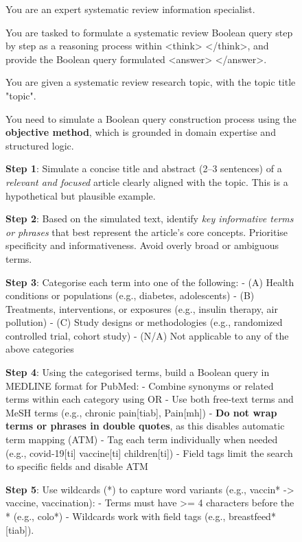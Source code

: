 \begin{figure}[ht!]
	\centering
		\small
	\begin{PromptBox}
		You are an expert systematic review information specialist.
		
		You are tasked to formulate a systematic review Boolean query step by step as a reasoning process within <think> </think>, and provide the Boolean query formulated <answer> </answer>.
	\end{PromptBox}
	
	\vspace{1em}
	
	\begin{PromptBox}
		You are given a systematic review research topic, with the topic title "{topic}".
		
		You need to simulate a Boolean query construction process using the \textbf{objective method}, which is grounded in domain expertise and structured logic.
		
		\textbf{Step 1}: Simulate a concise title and abstract (2–3 sentences) of a \textit{relevant and focused} article clearly aligned with the topic. This is a hypothetical but plausible example.
		
		\textbf{Step 2}: Based on the simulated text, identify \textit{key informative terms or phrases} that best represent the article's core concepts. Prioritise specificity and informativeness. Avoid overly broad or ambiguous terms.
		
		\textbf{Step 3}: Categorise each term into one of the following:
		- (A) Health conditions or populations (e.g., diabetes, adolescents)
		- (B) Treatments, interventions, or exposures (e.g., insulin therapy, air pollution)
		- (C) Study designs or methodologies (e.g., randomized controlled trial, cohort study)
		- (N/A) Not applicable to any of the above categories
		
		\textbf{Step 4}: Using the categorised terms, build a Boolean query in MEDLINE format for PubMed:
		- Combine synonyms or related terms within each category using OR
		- Use both free-text terms and MeSH terms (e.g., chronic pain[tiab], Pain[mh])
		- \textbf{Do not wrap terms or phrases in double quotes}, as this disables automatic term mapping (ATM)
		- Tag each term individually when needed (e.g., covid-19[ti] vaccine[ti] children[ti])
		- Field tags limit the search to specific fields and disable ATM
		
		\textbf{Step 5}: Use wildcards (*) to capture word variants (e.g., vaccin* -> vaccine, vaccination):
		- Terms must have >= 4 characters before the * (e.g., colo*)
		- Wildcards work with field tags (e.g., breastfeed*[tiab]).
		

\end{PromptBox}
\end{figure}
